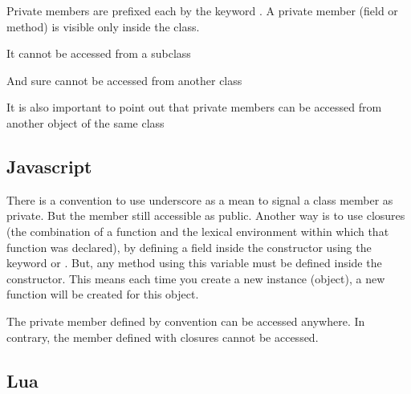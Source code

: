 \documentclass{KodeBook}
\begin{document}
Private members are prefixed each by the keyword . 
A private member (field or method) is visible only inside the class. 



It cannot be accessed from a subclass



And sure cannot be accessed from another class



It is also important to point out that private members can be accessed from another object of the same class 



\subsection{Javascript} 

There is a convention to use underscore \keyword{\_} as a mean to signal a class member as private. 
But the member still accessible as public. 
Another way is to use closures (the combination of a function and the lexical environment within which that function was declared), by defining a field inside the constructor using the keyword  or .
But, any method using this variable must be defined inside the constructor.
This means each time you create a new instance (object), a new function will be created for this object. 



The private member defined by convention can be accessed anywhere. 
In contrary, the member defined with closures cannot be accessed.



\subsection{Lua}
\end{document}
